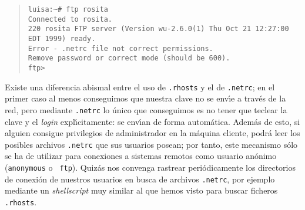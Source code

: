 \begin{quote}
\begin{verbatim}
luisa:~# ftp rosita
Connected to rosita.
220 rosita FTP server (Version wu-2.6.0(1) Thu Oct 21 12:27:00 EDT 1999) ready.
Error - .netrc file not correct permissions.
Remove password or correct mode (should be 600).
ftp>
\end{verbatim}
\end{quote}
Existe una diferencia abismal entre el uso de {\tt .rhosts} y el de 
{\tt .netrc}; en el primer caso al menos conseguimos que nuestra clave no se
env\'{\i}e a trav\'es de la red, pero mediante {\tt .netrc} lo \'unico que
conseguimos es no tener que teclear la clave y el {\it login} 
expl\'{\i}citamente: se env\'{\i}an de forma autom\'atica. Adem\'as de esto,
si alguien consigue privilegios de administrador en la 
m\'aquina cliente, podr\'a leer los posibles archivos {\tt .netrc} que sus
usuarios posean; por tanto, este mecanismo s\'olo se ha de utilizar para
conexiones a sistemas remotos como usuario an\'onimo ({\tt anonymous} o {\tt
ftp}). Quiz\'as nos convenga rastrear peri\'odicamente los directorios de
conexi\'on de nuestros usuarios en busca de archivos {\tt .netrc}, por ejemplo
mediante un {\it shellscript} muy similar al que hemos visto para buscar
ficheros {\tt .rhosts}.
